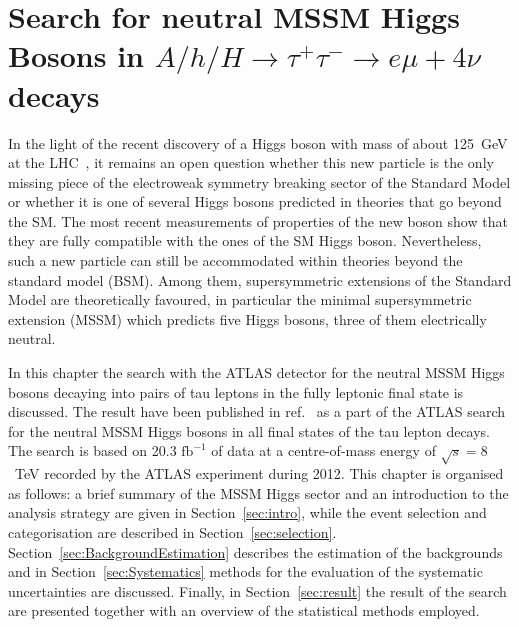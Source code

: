 \chapter[Neutral MSSM Higgs Bosons Search]{Search for neutral MSSM Higgs Bosons in  
$A/h/H \rightarrow \tau^{+}\tau^{-} \rightarrow e \mu + 4\nu$ decays} \label{chap:anal}


%
 \vspace{0.5cm}

%
%
In the light of the recent discovery of a Higgs 
boson with mass of about 125~GeV at the LHC~\cite{AHiggsO,CHiggsO}, it remains an open question
whether this new particle is the only missing piece of the electroweak symmetry breaking
sector of the Standard Model or whether it is one of several Higgs bosons predicted in  theories 
that go beyond the SM. The most recent measurements \cite{ASpin0,ACouplings,CFermions,CWidth} of 
properties of the new boson show that they are fully compatible with the ones of the SM Higgs boson. 
Nevertheless, such a new particle can still be accommodated within theories beyond the 
standard model (BSM). Among  them, supersymmetric extensions of the Standard Model are theoretically favoured,
in particular the minimal supersymmetric extension (MSSM) which predicts five Higgs bosons, three of them electrically neutral.

In this chapter  the search  with the ATLAS detector for the neutral MSSM Higgs bosons decaying into pairs of tau leptons
in the fully leptonic final state is discussed. 
The result have been published in ref.~\cite{yuppy} as a part of the ATLAS search for the neutral
MSSM Higgs bosons in all final states of the tau lepton decays. 
The search is based on 20.3 $\text{fb}^{-1}$ of  data at a centre-of-mass energy of $\sqrt{s} = 8$~TeV
recorded by the ATLAS experiment during 2012.
This chapter is organised as follows: a brief summary of the MSSM Higgs sector 
and an introduction to the analysis strategy are given in Section~\ref{sec:intro},
while the event selection and categorisation are described in Section~\ref{sec:selection}. 
Section~\ref{sec:BackgroundEstimation} describes the estimation of the backgrounds and
in Section~\ref{sec:Systematics} methods for the evaluation of the  systematic uncertainties are discussed. Finally, 
in Section~\ref{sec:result} the result of the search are presented together with an overview of the statistical methods employed.


